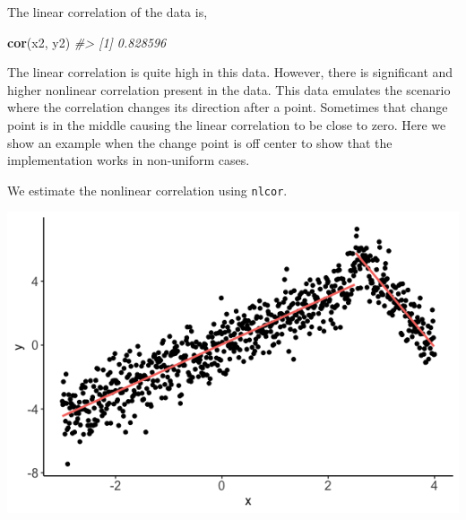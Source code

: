 \documentclass[]{article}
\newenvironment{Shaded}{\begin{snugshade}}{\end{snugshade}}
\newcommand{\CommentTok}[1]{\textcolor[rgb]{0.56,0.35,0.01}{\textit{#1}}}
\newcommand{\DataTypeTok}[1]{\textcolor[rgb]{0.13,0.29,0.53}{#1}}
\newcommand{\KeywordTok}[1]{\textcolor[rgb]{0.13,0.29,0.53}{\textbf{#1}}}
\newcommand{\NormalTok}[1]{#1}
\newcommand{\OperatorTok}[1]{\textcolor[rgb]{0.81,0.36,0.00}{\textbf{#1}}}
\newcommand{\StringTok}[1]{\textcolor[rgb]{0.31,0.60,0.02}{#1}}
\begin{document}
The linear correlation of the data is,

\begin{Shaded}
\begin{Highlighting}[]
\KeywordTok{cor}\NormalTok{(x2, y2)}
\CommentTok{#> [1] 0.828596}
\end{Highlighting}
\end{Shaded}

The linear correlation is quite high in this data. However, there is
significant and higher nonlinear correlation present in the data. This
data emulates the scenario where the correlation changes its direction
after a point. Sometimes that change point is in the middle causing the
linear correlation to be close to zero. Here we show an example when the
change point is off center to show that the implementation works in
non-uniform cases.

We estimate the nonlinear correlation using \texttt{nlcor}.

\begin{Shaded}
\end{Shaded}

\begin{center}\includegraphics{README_files/figure-markdown_strict/Figure-2.2-1} \end{center}
\end{document}
